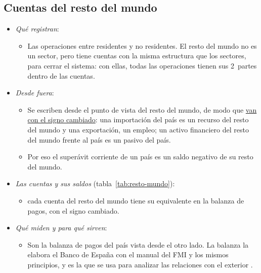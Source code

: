 \documentclass[11pt]{article}
\begin{document}
\subsection{Cuentas del resto del mundo}\label{sec:resto-mundo}

\begin{itemize}
\item \emph{Qué registran}:
  \begin{itemize}
  \item Las operaciones entre residentes y no residentes. El resto del mundo no es un sector, pero tiene cuentas con la misma estructura que los sectores, para cerrar el sistema: con ellas, todas las operaciones tienen sus 2~partes dentro de las cuentas.
  \end{itemize}
\item \emph{Desde fuera}:
  \begin{itemize}
  \item Se escriben desde el punto de vista del resto del mundo, de modo que \uline{van con el signo cambiado}: una importación del país es un recurso del resto del mundo y una exportación, un empleo; un activo financiero del resto del mundo frente al país es un pasivo del país.
  \item Por eso el superávit corriente de un país es un saldo negativo de su resto del mundo.
  \end{itemize}
\item \emph{Las cuentas y sus saldos} (tabla~\ref{tab:resto-mundo}):
  \begin{itemize}
  \item cada cuenta del resto del mundo tiene su equivalente en la balanza de pagos, con el signo cambiado.
  \end{itemize}
\item \emph{Qué miden y para qué sirven}:
  \begin{itemize}
  \item Son la balanza de pagos del país vista desde el otro lado. La balanza la elabora el Banco de España con el manual del FMI y los mismos principios, y es la que se usa para analizar las relaciones con el exterior .
  \end{itemize}
\end{itemize}
\end{document}

